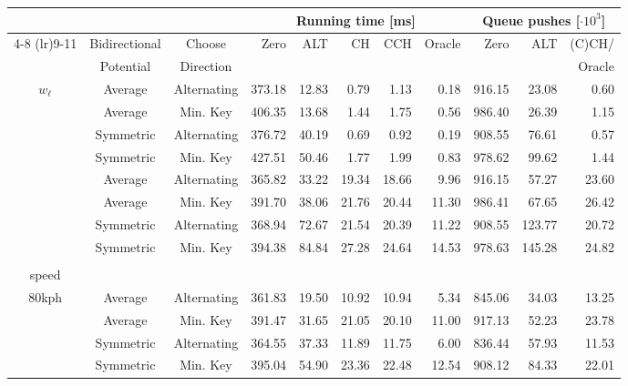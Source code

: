 \begin{tabular}{cccrrrrrrrr}
\toprule
 &  &  & \multicolumn{5}{c}{Running time [ms]} & \multicolumn{3}{c}{Queue pushes [$\cdot 10^3$]} \\ \cmidrule(lr){4-8} \cmidrule(lr){9-11}\multirow{2}{*}{$w_q$} & Bidirectional & Choose    & \multirow{2}{*}{Zero} & \multirow{2}{*}{ALT} & \multirow{2}{*}{CH} & \multirow{2}{*}{CCH} & \multirow{2}{*}{Oracle} & \multirow{2}{*}{Zero} & \multirow{2}{*}{ALT} & (C)CH/ \\
 & Potential     & Direction & & & & & & & & Oracle \\
\midrule
\multirow{4}{*}{$w_{\ell}$} &   Average &               Alternating &            373.18 & 12.83 &  0.79 &  1.13 &   0.18 &                     916.15 &  23.08 &         0.60 \\
           &   Average &                  Min. Key &            406.35 & 13.68 &  1.44 &  1.75 &   0.56 &                     986.40 &  26.39 &         1.15 \\
           & Symmetric &               Alternating &            376.72 & 40.19 &  0.69 &  0.92 &   0.19 &                     908.55 &  76.61 &         0.57 \\
           & Symmetric &                  Min. Key &            427.51 & 50.46 &  1.77 &  1.99 &   0.83 &                     978.62 &  99.62 &         1.44 \\
\addlinespace
     \multirow{4}{*}{$w_{\ell} \cdot 1.05$} &   Average &               Alternating &            365.82 & 33.22 & 19.34 & 18.66 &   9.96 &                     916.15 &  57.27 &        23.60 \\
           &   Average &                  Min. Key &            391.70 & 38.06 & 21.76 & 20.44 &  11.30 &                     986.41 &  67.65 &        26.42 \\
           & Symmetric &               Alternating &            368.94 & 72.67 & 21.54 & 20.39 &  11.22 &                     908.55 & 123.77 &        20.72 \\
           & Symmetric &                  Min. Key &            394.38 & 84.84 & 27.28 & 24.64 &  14.53 &                     978.63 & 145.28 &        24.82 \\
\addlinespace
   \multirow{4}{*}{\shortstack{$w_{\ell} \cdot 1.5$ if\\ speed \\ 80kph}} &   Average &               Alternating &            361.83 & 19.50 & 10.92 & 10.94 &   5.34 &                     845.06 &  34.03 &        13.25 \\
           &   Average &                  Min. Key &            391.47 & 31.65 & 21.05 & 20.10 &  11.00 &                     917.13 &  52.23 &        23.78 \\
           & Symmetric &               Alternating &            364.55 & 37.33 & 11.89 & 11.75 &   6.00 &                     836.44 &  57.93 &        11.53 \\
           & Symmetric &                  Min. Key &            395.04 & 54.90 & 23.36 & 22.48 &  12.54 &                     908.12 &  84.33 &        22.01 \\
\bottomrule
\end{tabular}

